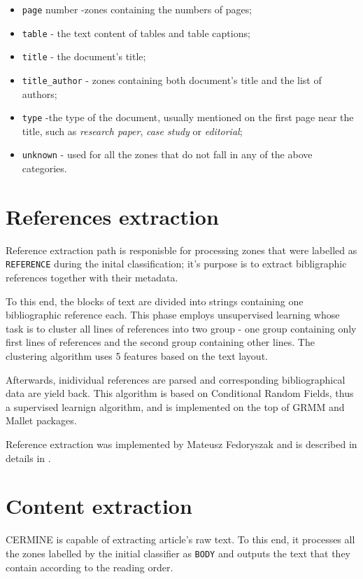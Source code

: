 \begin{itemize}
    \item \verb+page+ number -zones containing the numbers of pages;
    \item \verb+table+ - the text content of tables and table captions;
    \item \verb+title+ - the document's title;
    \item \verb+title_author+ - zones containing both document's title and the list of authors;
    \item \verb+type+ -the type of the document, usually mentioned on the first page near the title, such as \textit{research paper}, \textit{case study} or \textit{editorial};
    \item \verb+unknown+ - used for all the zones that do not fall in any of the above categories.
\end{itemize}

\section{References extraction}
Reference extraction path is responisble for processing zones that were labelled as \verb+REFERENCE+ during the inital classification; it's purpose is to extract bibligraphic references together with their metadata.

To this end, the blocks of text are divided into strings containing one bibliographic reference each. This phase employs unsupervised learning whose task is to cluster all lines of references into two group - one group containing only first lines of references and the second group containing other lines. The clustering algorithm uses 5 features based on the text layout.

Afterwards, inidividual references are parsed and corresponding bibliographical data are yield back. This algorithm is based on Conditional Random Fields, thus a supervised learnign algorithm, and is implemented on the top of GRMM and Mallet packages.

Reference extraction was implemented by Mateusz Fedoryszak and is described in details in \cite{DominikaTkaczykPaweSzostekMateuszFedoryszakPiotrJanDendek2014}.
\section{Content extraction}
CERMINE is capable of extracting article's raw text. To this end, it processes all the zones labelled by the initial classifier as \verb+BODY+ and outputs the text that they contain according to the reading order. 

